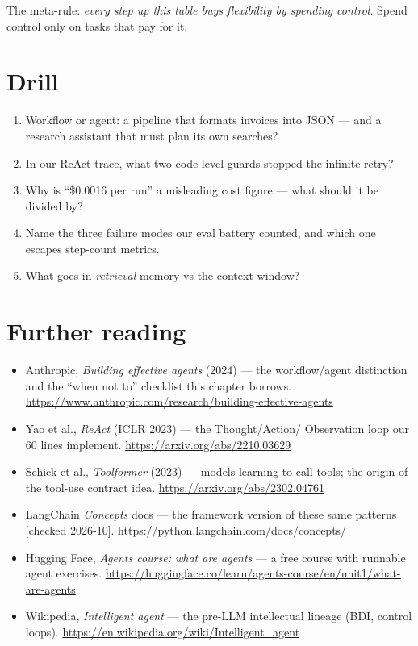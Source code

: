 The meta-rule: \emph{every step up this table buys flexibility by
spending control}. Spend control only on tasks that pay for it.

\section*{Drill}
\begin{enumerate}
\item Workflow or agent: a pipeline that formats invoices into JSON
--- and a research assistant that must plan its own searches?
\item In our ReAct trace, what two code-level guards stopped the
infinite retry?
\item Why is ``\$0.0016 per run'' a misleading cost figure --- what
should it be divided by?
\item Name the three failure modes our eval battery counted, and
which one escapes step-count metrics.
\item What goes in \emph{retrieval} memory vs the context window?
\end{enumerate}

\section*{Further reading}
\label{sec:further16}
\begin{itemize}
\item Anthropic, \emph{Building effective agents} (2024) --- the
workflow/agent distinction and the ``when not to'' checklist this
chapter borrows.
\url{https://www.anthropic.com/research/building-effective-agents}
\item Yao et al., \emph{ReAct} (ICLR 2023) --- the Thought/Action/
Observation loop our 60 lines implement.
\url{https://arxiv.org/abs/2210.03629}
\item Schick et al., \emph{Toolformer} (2023) --- models learning to
call tools; the origin of the tool-use contract idea.
\url{https://arxiv.org/abs/2302.04761}
\item LangChain \emph{Concepts} docs --- the framework version of
these same patterns [checked 2026-10].
\url{https://python.langchain.com/docs/concepts/}
\item Hugging Face, \emph{Agents course: what are agents} --- a free
course with runnable agent exercises.
\url{https://huggingface.co/learn/agents-course/en/unit1/what-are-agents}
\item Wikipedia, \emph{Intelligent agent} --- the pre-LLM intellectual
lineage (BDI, control loops).
\url{https://en.wikipedia.org/wiki/Intelligent_agent}
\end{itemize}

